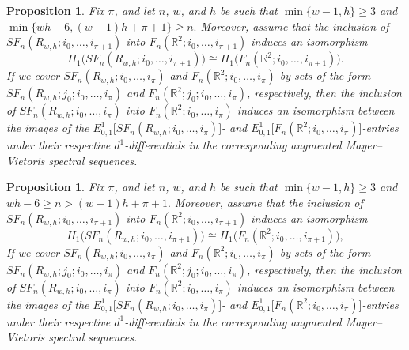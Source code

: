 \documentclass[pagebackref,colorlinks,citecolor=blue,linkcolor=blue,urlcolor=blue,filecolor=blue]{article}
\newtheorem{prop}[thm]{Proposition}
\theoremstyle{definition}\newtheorem{definition}[thm]{Definition}
\theoremstyle{definition}
\newcommand{\R}{\ensuremath{\mathbb{R}}}
\begin{document}
\begin{prop}\label{k=1 images of d1 differentials are the same n small}
Fix $\pi$, and let $n$, $w$, and $h$ be such that $\min\{w-1,h\}\ge 3$ and $\min\big\{wh-6, (w-1)h+\pi+1\big\}\ge n.$
Moreover, assume that the inclusion of $SF_{n}(R_{w,h}; i_{0},\dots, i_{\pi+1})$ into $F_{n}(\R^{2}; i_{0},\dots, i_{\pi+1})$ induces an isomorphism 
\[
H_{1}\big(SF_{n}(R_{w,h}; i_{0},\dots, i_{\pi+1})\big)\cong H_{1}\big(F_{n}(\R^{2}; i_{0},\dots, i_{\pi+1})\big).
\]
If we cover $SF_{n}(R_{w,h}; i_{0}, \dots, i_{\pi})$ and $F_{n}(\R^{2}; i_{0}, \dots, i_{\pi})$ by sets of the form $SF_{n}(R_{w,h}; j_{0}; i_{0}, \dots, i_{\pi})$ and $F_{n}(\R^{2}; j_{0}; i_{0}, \dots, i_{\pi})$, respectively, then the inclusion of $SF_{n}(R_{w,h}; i_{0}, \dots, i_{\pi})$ into $F_{n}(\R^{2}; i_{0}, \dots, i_{\pi})$ induces an isomorphism between the images of the $E^{1}_{0,1}\big[SF_{n}(R_{w,h}; i_{0}, \dots, i_{\pi})\big]$- and $E^{1}_{0,1}\big[F_{n}(\R^{2}; i_{0}, \dots, i_{\pi})\big]$-entries under their respective $d^{1}$-differentials in the corresponding augmented Mayer--Vietoris spectral sequences.
\end{prop}

\begin{prop}\label{k=1 images of d1 differentials are the same n large}
Fix $\pi$, and let $n$, $w$, and $h$ be such that $\min\{w-1,h\}\ge 3$ and $wh-6\ge n>(w-1)h+\pi+1.$
Moreover, assume that the inclusion of $SF_{n}(R_{w,h}; i_{0},\dots, i_{\pi+1})$ into $F_{n}(\R^{2}; i_{0},\dots, i_{\pi+1})$ induces an isomorphism 
\[
H_{1}\big(SF_{n}(R_{w,h}; i_{0},\dots, i_{\pi+1})\big)\cong H_{1}\big(F_{n}(\R^{2}; i_{0},\dots, i_{\pi+1})\big),
\]
If we cover $SF_{n}(R_{w,h}; i_{0}, \dots, i_{\pi})$ and $F_{n}(\R^{2}; i_{0}, \dots, i_{\pi})$ by sets of the form $SF_{n}(R_{w,h}; j_{0}; i_{0}, \dots, i_{\pi})$ and $F_{n}(\R^{2}; j_{0}; i_{0}, \dots, i_{\pi})$, respectively, then the inclusion of $SF_{n}(R_{w,h}; i_{0}, \dots, i_{\pi})$ into $F_{n}(\R^{2}; i_{0}, \dots, i_{\pi})$ induces an isomorphism between the images of the $E^{1}_{0,1}\big[SF_{n}(R_{w,h}; i_{0}, \dots, i_{\pi})\big]$- and $E^{1}_{0,1}\big[F_{n}(\R^{2}; i_{0}, \dots, i_{\pi})\big]$-entries under their respective $d^{1}$-differentials in the corresponding augmented Mayer--Vietoris spectral sequences.
\end{prop}
\end{document}
